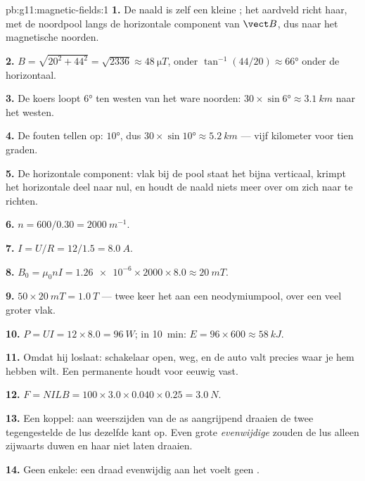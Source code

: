 \begin{solution}{pb:g11:magnetic-fields:1}
\textbf{1.} De naald is zelf een kleine ; het aardveld richt haar,
met de noordpool langs de horizontale component van $\vect B$, dus naar
het magnetische noorden.

\textbf{2.} $B = \sqrt{20^2 + 44^2} = \sqrt{2336} \approx
\qty{48}{\micro T}$, onder $\tan^{-1}(44/20) \approx \ang{66}$ onder de
horizontaal.

\textbf{3.} De koers loopt $\ang{6}$ ten westen van het ware noorden:
$30 \times \sin\ang{6} \approx \qty{3.1}{km}$ naar het westen.

\textbf{4.} De fouten tellen op: $\ang{10}$, dus
$30 \times \sin\ang{10} \approx \qty{5.2}{km}$ --- vijf kilometer voor
tien graden.

\textbf{5.} De horizontale component: vlak bij de pool staat het 
bijna verticaal, krimpt het horizontale deel naar nul, en houdt de naald
niets meer over om zich naar te richten.

\textbf{6.} $n = 600/0.30 = \qty{2000}{m^{-1}}$.

\textbf{7.} $I = U/R = 12/1.5 = \qty{8.0}{A}$.

\textbf{8.} $B_0 = \mu_0 n I = \num{1.26e-6} \times 2000 \times 8.0
\approx \qty{20}{mT}$.

\textbf{9.} $50 \times \qty{20}{mT} = \qty{1.0}{T}$ --- twee keer het
 aan een neodymiumpool, over een veel groter vlak.

\textbf{10.} $P = UI = 12 \times 8.0 = \qty{96}{W}$; in
\qty{10}{\minute}: $E = 96 \times 600 \approx \qty{58}{kJ}$.

\textbf{11.} Omdat hij loslaat: schakelaar open,  weg, en de auto
valt precies waar je hem hebben wilt. Een permanente  houdt voor
eeuwig vast.

\textbf{12.} $F = NILB = 100 \times 3.0 \times 0.040 \times 0.25 =
\qty{3.0}{N}$.

\textbf{13.} Een koppel: aan weerszijden van de as aangrijpend draaien de
twee tegengestelde  de lus dezelfde kant op. Even grote
\emph{evenwijdige}  zouden de lus alleen zijwaarts duwen en haar
niet laten draaien.

\textbf{14.} Geen enkele: een draad evenwijdig aan het  voelt geen
.


\end{solution}
